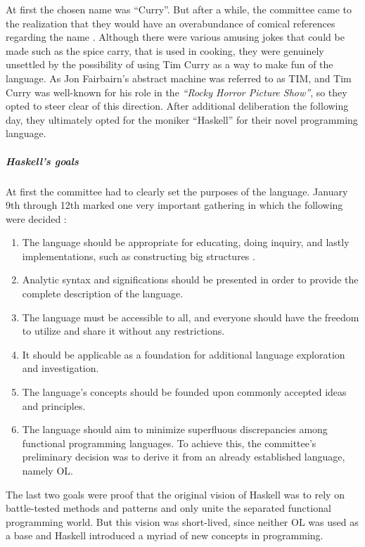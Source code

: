 \documentclass[a4paper, titlepage, twoside]{article}
\begin{document}
At first the chosen name was ``Curry''. But after a while, the committee came to the realization that they would have an overabundance of comical references regarding the name \autocite{hudakHistoryHaskellBeing2007}. Although there were various amusing jokes that could be made such as the spice carry, that is used in cooking, they were genuinely unsettled by the possibility of using Tim Curry as a way to make fun of the language.
As Jon Fairbairn's abstract machine was referred to as TIM, and Tim Curry was well-known for his role in the \emph{``Rocky Horror Picture Show''}, so they opted to steer clear of this direction. After additional deliberation the following day, they ultimately opted for the moniker ``Haskell'' for their novel programming language.

\subparagraph*{Haskell's goals}
\label{sec:org05d13b0}

At first the committee had to clearly set the purposes of the language. January 9th through 12th marked one very important gathering in which the following were decided \autocite{hudakHistoryHaskellBeing2007}:

\begin{enumerate}
\item The language should be appropriate for educating, doing inquiry, and lastly implementations, such as constructing big structures .

\item Analytic syntax and significations should be presented in order to provide the complete description of the language.

\item The language must be accessible to all, and everyone should have the freedom to utilize and share it without any restrictions.

\item It should be applicable as a foundation for additional language exploration and investigation.

\item The language's concepts should be founded upon commonly accepted ideas and principles.

\item The language should aim to minimize superfluous discrepancies among functional programming languages. To achieve this, the committee's preliminary decision was to derive it from an already established language, namely OL.
\end{enumerate}

The last two goals were proof that the original vision of Haskell was to rely on battle-tested methods and patterns and only unite the separated functional programming world. But this vision was short-lived, since neither OL was used as a base and Haskell introduced a myriad of new concepts in programming.
\end{document}
